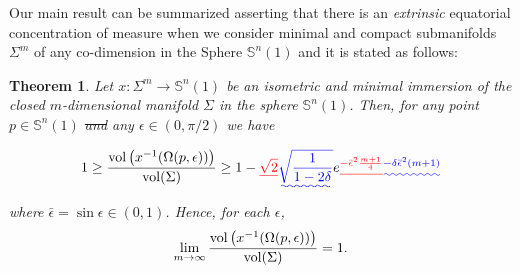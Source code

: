 \documentclass{amsart}
\newtheorem{theorem}{Theorem}[section]
\theoremstyle{definition}
\theoremstyle{remark}
\providecommand{\DIFadd}[1]{{\protect\color{blue}\uwave{#1}}} %
\providecommand{\DIFdel}[1]{{\protect\color{red}\sout{#1}}}                      %
\providecommand{\DIFaddbegin}{} %
\providecommand{\DIFaddend}{} %
\providecommand{\DIFdelbegin}{} %
\providecommand{\DIFdelend}{} %
\begin{document}
Our main result can be summarized asserting that there is an {\em extrinsic} equatorial concentration of measure when we consider minimal and compact submanifolds $\Sigma^m$ of any co-dimension in the Sphere $\mathbb{S}^n(1)$ and it is stated as follows:

\begin{theorem}\label{mainInt}
Let  $x: \Sigma^m \to \mathbb{S}^n(1)$ be an isometric and minimal immersion of the closed $m$-dimensional manifold $\Sigma$ in the sphere  $\mathbb{S}^n(1)$. Then, for any point $p \in \mathbb{S}^n(1)$ \DIFdelbegin \DIFdel{and }\DIFdelend \DIFaddbegin \DIFadd{, }\DIFaddend any  $\epsilon \in (0,\pi/2)$ \DIFaddbegin \DIFadd{and any $\delta\in [0,\frac{1}{2})$ }\DIFaddend we have 

\begin{equation}\label{eq4}
1\geq \frac{{\rm vol}\left(x^{-1}(\Omega(p,\epsilon))\right)}{{\rm vol}(\Sigma)}\geq  1- \DIFdelbegin \DIFdel{\sqrt{2}}\DIFdelend \DIFaddbegin \DIFadd{\sqrt{\frac{1}{1-2\delta}}}\DIFaddend e\DIFdelbegin \DIFdel{^{-\bar\epsilon^2\frac{m+1}{4}}
}\DIFdelend \DIFaddbegin \DIFadd{^{-\delta\bar\epsilon^2(m+1)}
}\DIFaddend \end{equation}
where \DIFdelbegin \DIFdel{$\bar\epsilon=\sin\epsilon \in (0,1)$}\DIFdelend \DIFaddbegin \DIFadd{$\bar\epsilon=\sin\epsilon$}\DIFaddend . Hence, for each  $\epsilon$,
\begin{equation}\label{eq5}
\lim_{m\to\infty}\frac{{\rm vol}\left(x^{-1}(\Omega(p,\epsilon))\right)}{{\rm vol}(\Sigma)}=1.
\end{equation}


\end{theorem}
\end{document}
